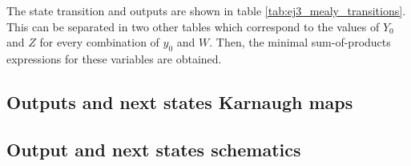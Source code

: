 \documentclass[../../e3_tp3_main.tex]{subfiles}
\begin{document}
The state transition and outputs are shown in table \ref{tab:ej3_mealy_transitions}. This can be separated in two other tables which correspond to the values of $Y_0$ and $Z$ for every combination of $y_0$ and $W$. Then, the minimal sum-of-products expressions for these variables are obtained. 

\subsection{Outputs and next states Karnaugh maps}


\subsection{Output and next states schematics}
\end{document}

